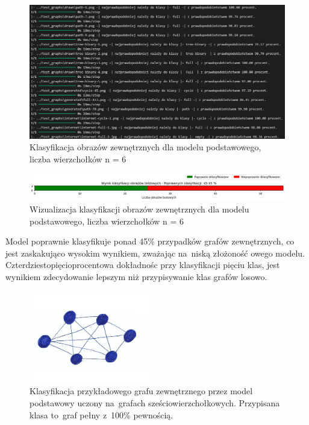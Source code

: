 \begin{figure}[ht]
	\centering
	\includegraphics[width=15.5cm]{resources/tests/images/v3/base6_txt.png}
	\caption{Klasyfikacja obrazów zewnętrznych dla modelu podstawowego, liczba wierzchołków n = 6}
	\label{Fig:tests-base-3b}
\end{figure}
\FloatBarrier

\begin{figure}[ht]
	\centering
	\includegraphics[width=15.5cm]{resources/tests/images/v3/base6_bar.png}
	\caption{Wizualizacja klasyfikacji obrazów zewnętrznych dla modelu podstawowego, liczba wierzchołków n = 6}
	\label{Fig:tests-base-3c}
\end{figure}
\FloatBarrier

Model poprawnie klasyfikuje ponad 45\% przypadków grafów zewnętrznych,
co jest zaskakująco wysokim wynikiem, zważając na~niską złożoność owego modelu.
Czterdziestopięcioprocentowa dokładnośc przy klasyfikacji pięciu klas,
jest wynikiem zdecydowanie lepszym niż przypisywanie klas grafów losowo.

\begin{figure}[ht]
	\centering
	\includegraphics[height=4cm]{../graph_classification/test_graphs/drawn/full-9.png}
	\caption{Klasyfikacja przykładowego grafu zewnętrznego przez model podstawowy uczony na~grafach sześciowierzchołkowych.
		Przypisana klasa to~graf pełny z~100\% pewnością.}
	\label{Fig:tests-base-3d}
\end{figure}
\FloatBarrier

